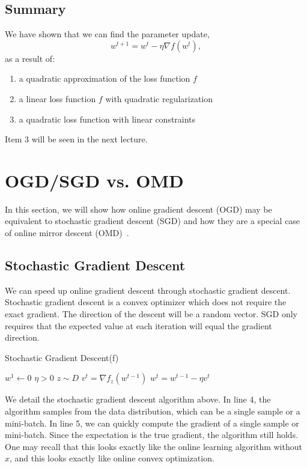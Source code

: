\documentclass[11pt]{article}
\begin{document}
\subsection{Summary}
We have shown that we can find the parameter update, $$w^{t+1} = w^t - \eta \nabla f(w^t),$$
as a result of:
\begin{enumerate}
    \item a quadratic approximation of the loss function $f$
    \item a linear loss function $f$ with quadratic regularization
    \item a quadratic loss function with linear constraints
\end{enumerate}
Item 3 will be seen in the next lecture.

\section{OGD/SGD vs. OMD}
In this section, we will show how online gradient descent (OGD) may be equivalent to stochastic gradient descent (SGD) and how they are a special case of online mirror descent (OMD)~\cite{mcmahan2011follow}.
\subsection{Stochastic Gradient Descent}
We can speed up online gradient descent through stochastic gradient descent. Stochastic gradient descent is a convex optimizer which does not require the exact gradient. The direction of the descent will be a random vector. SGD only requires that the expected value at each iteration will equal the gradient direction. 

\begin{algorithm}[!h]
\caption{Stochastic Gradient Descent(f)}
\begin{algorithmic}[1]
    \STATE $w^1 \gets 0$
    \STATE $\eta > 0$
        \STATE $z \sim D$
        \STATE $v^t = \nabla f_z (w^{t-1})$
        \STATE $w^t = w^{t-1} - \eta v^t$
    \ENDFOR
\end{algorithmic}
\end{algorithm}

We detail the stochastic gradient descent algorithm above. In line 4, the algorithm samples from the data distribution, which can be a single sample or a mini-batch. In line 5, we can quickly compute the gradient of a single sample or mini-batch. Since the expectation is the true gradient, the algorithm still holds. One may recall that this looks exactly like the online learning algorithm without $x$, and this looks exactly like online convex optimization.
\end{document}
